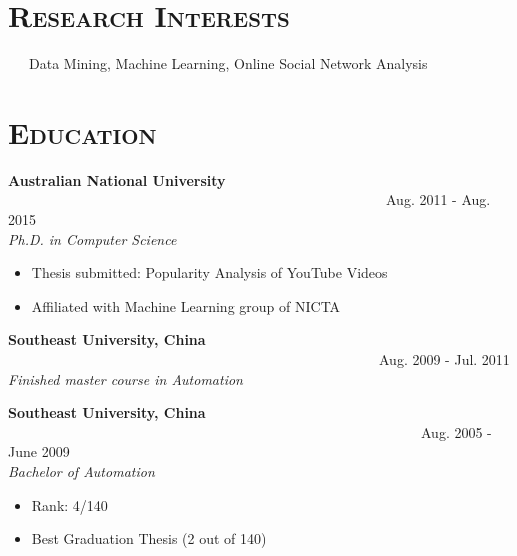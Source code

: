\begin{resume}




\section{\textsc{Research  Interests}}
\ \ \ Data Mining, Machine Learning, Online Social Network Analysis

\section{\textsc{Education}}

\textbf{Australian National University}  \ \  \ \ \ \ \ \ \ \ \ \ \ \ \ \ \ \ \ \ \ \ \ \ \ \ \ \ \ \ \ \ \ \ \ \ \ \ \ \ \ \ \ \ \ \ \ \ \ \ \ \ \ \   Aug. 2011 - Aug. 2015 \\
\emph{Ph.D. in Computer Science} 


\begin{itemize}
  \item Thesis submitted: Popularity Analysis of YouTube Videos
  \item Affiliated with Machine Learning group of NICTA
 \end{itemize}

\textbf{Southeast University, China} \ \ \ \ \ \ \ \ \ \ \ \ \ \ \ \ \ \ \ \ \ \ \ \ \ \ \ \ \ \ \ \ \ \ \ \ \ \ \ \ \ \ \ \ \ \ \ \ \  \ \ \ \   Aug. 2009 - Jul. 2011 \\ 
\emph{Finished master course in Automation}

\textbf{Southeast University, China} \ \ \ \ \ \ \ \ \ \ \ \ \ \ \ \  \ \ \ \ \ \ \ \ \ \ \ \ \ \ \ \ \ \ \ \ \ \ \ \ \ \ \ \ \ \ \  \ \ \ \ \ \ \ \ \ \ \ \ Aug. 2005 - June 2009 \\ 
\emph{Bachelor of Automation} 

 \begin{itemize}
   \item Rank: 4/140
   \item Best Graduation Thesis (2 out of 140)
 \end{itemize}




\end{resume}
